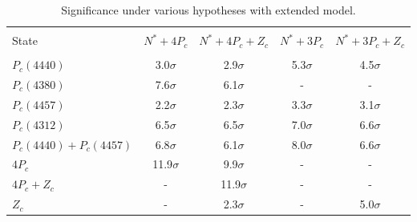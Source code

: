  \begin{table}[htb]
\centering
\caption{ Significance under various hypotheses with extended model. }
\label{tab:sig_extend}
\vspace{0.2cm}
\begin{tabular}{ l|c|c|c|c }
\hline\\[-2.5ex]
 State                   & $N^*+4P_c$   & $N^*+4P_c+Z_c$  & $N^*+3P_c$   & $N^*+3P_c+Z_c$  \\ 
 \hline \\[-2.5ex]
 $P_c(4440)$             & 3.0$\sigma$  & 2.9$\sigma$  & 5.3$\sigma$  & 4.5$\sigma$     \\
 $P_c(4380)$             & 7.6$\sigma$  & 6.1$\sigma$  & -            & -               \\
 $P_c(4457)$             & 2.2$\sigma$  & 2.3$\sigma$  & 3.3$\sigma$  & 3.1$\sigma$     \\
 $P_c(4312)$             & 6.5$\sigma$  & 6.5$\sigma$  & 7.0$\sigma$  & 6.6$\sigma$     \\
 $P_c(4440)+P_c(4457)$   & 6.8$\sigma$  & 6.1$\sigma$  & 8.0$\sigma$  & 6.6$\sigma$     \\
 $4P_c$                  & 11.9$\sigma$ & 9.9$\sigma$  & -            & -               \\
 $4P_c+Z_c$              & -            & 11.9$\sigma$ & -            & -     \\
 $Z_c$                   & -            & 2.3$\sigma$  & -            & 5.0$\sigma$     \\
\hline
\end{tabular}
\end{table}




